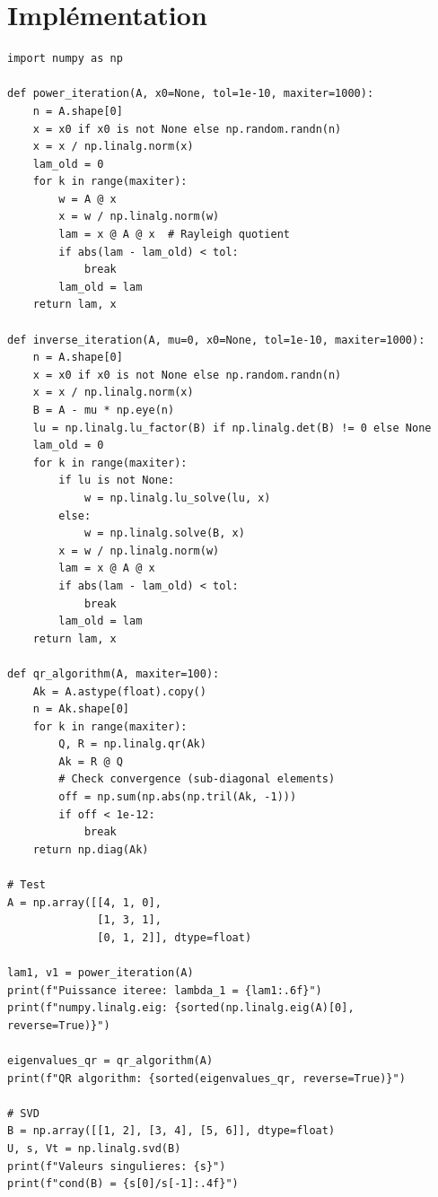 \section{Impl\'ementation}

\begin{codeblock}[title=\textbf{Python}]
\begin{verbatim}
import numpy as np

def power_iteration(A, x0=None, tol=1e-10, maxiter=1000):
    n = A.shape[0]
    x = x0 if x0 is not None else np.random.randn(n)
    x = x / np.linalg.norm(x)
    lam_old = 0
    for k in range(maxiter):
        w = A @ x
        x = w / np.linalg.norm(w)
        lam = x @ A @ x  # Rayleigh quotient
        if abs(lam - lam_old) < tol:
            break
        lam_old = lam
    return lam, x

def inverse_iteration(A, mu=0, x0=None, tol=1e-10, maxiter=1000):
    n = A.shape[0]
    x = x0 if x0 is not None else np.random.randn(n)
    x = x / np.linalg.norm(x)
    B = A - mu * np.eye(n)
    lu = np.linalg.lu_factor(B) if np.linalg.det(B) != 0 else None
    lam_old = 0
    for k in range(maxiter):
        if lu is not None:
            w = np.linalg.lu_solve(lu, x)
        else:
            w = np.linalg.solve(B, x)
        x = w / np.linalg.norm(w)
        lam = x @ A @ x
        if abs(lam - lam_old) < tol:
            break
        lam_old = lam
    return lam, x

def qr_algorithm(A, maxiter=100):
    Ak = A.astype(float).copy()
    n = Ak.shape[0]
    for k in range(maxiter):
        Q, R = np.linalg.qr(Ak)
        Ak = R @ Q
        # Check convergence (sub-diagonal elements)
        off = np.sum(np.abs(np.tril(Ak, -1)))
        if off < 1e-12:
            break
    return np.diag(Ak)

# Test
A = np.array([[4, 1, 0],
              [1, 3, 1],
              [0, 1, 2]], dtype=float)

lam1, v1 = power_iteration(A)
print(f"Puissance iteree: lambda_1 = {lam1:.6f}")
print(f"numpy.linalg.eig: {sorted(np.linalg.eig(A)[0], reverse=True)}")

eigenvalues_qr = qr_algorithm(A)
print(f"QR algorithm: {sorted(eigenvalues_qr, reverse=True)}")

# SVD
B = np.array([[1, 2], [3, 4], [5, 6]], dtype=float)
U, s, Vt = np.linalg.svd(B)
print(f"Valeurs singulieres: {s}")
print(f"cond(B) = {s[0]/s[-1]:.4f}")
\end{verbatim}
\end{codeblock}

